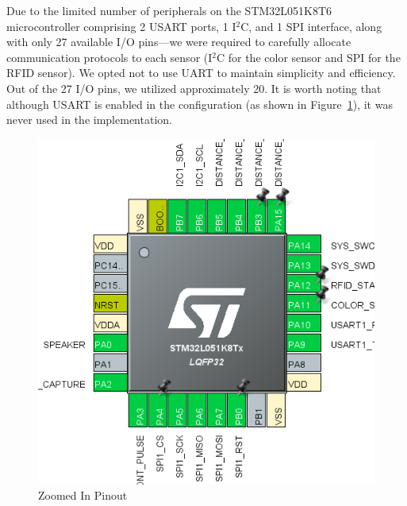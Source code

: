 \documentclass{article}
\begin{document}
Due to the limited number of peripherals on the STM32L051K8T6 microcontroller comprising 2 USART ports, 1 I$^2$C, and 1 SPI interface, along with only 27 available I/O pins—we were required to carefully allocate communication protocols to each sensor (I$^2$C for the color sensor and SPI for the RFID sensor). We opted not to use UART to maintain simplicity and efficiency. Out of the 27 I/O pins, we utilized approximately 20. It is worth noting that although USART is enabled in the configuration (as shown in Figure~\ref{fig:stm32_pinout_zoomed_in}), it was never used in the implementation.


\begin{figure}[H]
    \centering
    \begin{minipage}[b]{0.45\textwidth} %
        \centering
        \includegraphics[width=8\textwidth, height=0.4\textheight, keepaspectratio]{Figures/stm32_pinout_in.png}
        \caption{Zoomed In Pinout}
        \label{fig:stm32_pinout_zoomed_in}
    \end{minipage} \hfill
    \begin{minipage}[b]{0.48\textwidth} %
        \centering

\end{minipage}
\end{figure}
\end{document}
